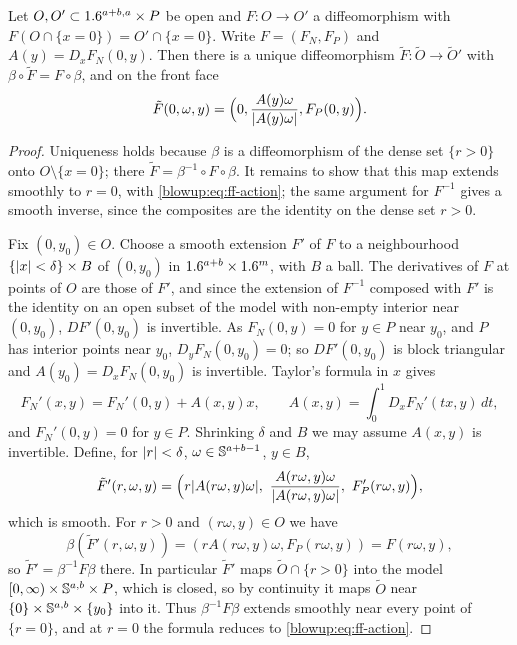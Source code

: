 \begin{theorem}\label{blowup:thm:invariance}
Let $O,O'\subset1.6^{a+b,a}\times P$ be open and $F:O\to O'$ a diffeomorphism with
$F(O\cap\{x=0\})=O'\cap\{x=0\}$. Write $F=(F_N,F_P)$ and
$A(y)=D_xF_N(0,y)$. Then there is a unique diffeomorphism $\tilde F:\tilde O\to\tilde O'$
with $\beta\circ\tilde F=F\circ\beta$, and on the front face
\begin{equation}\label{blowup:eq:ff-action}
  \tilde F(0,\omega,y)=\Big(0,\frac{A(y)\omega}{\lvert A(y)\omega\rvert},F_P(0,y)\Big).
\end{equation}
\end{theorem}
\begin{proof}
Uniqueness holds because $\beta$ is a diffeomorphism of the dense set $\{r>0\}$ onto
$O\setminus\{x=0\}$; there $\tilde F=\beta^{-1}\circ F\circ\beta$. It remains to show that
this map extends smoothly to $r=0$, with \eqref{blowup:eq:ff-action}; the same argument
for $F^{-1}$ gives a smooth inverse, since the composites are the identity on the dense
set $r>0$.

Fix $(0,y_0)\in O$. Choose a smooth extension $F'$ of $F$ to a neighbourhood
$\{\lvert x\rvert<\delta\}\times B$ of $(0,y_0)$ in $1.6^{a+b}\times1.6^m$, with $B$ a ball. The
derivatives of $F$ at points of $O$ are those of $F'$, and since the extension of $F^{-1}$
composed with $F'$ is the identity on an open subset of the model with non-empty
interior near $(0,y_0)$, $DF'(0,y_0)$ is invertible. As $F_N(0,y)=0$ for
$y\in P$ near $y_0$, and $P$ has interior points near $y_0$, $D_yF_N(0,y_0)=0$; so
$DF'(0,y_0)$ is block triangular and $A(y_0)=D_xF_N(0,y_0)$ is invertible. Taylor's
formula in $x$ gives
\begin{equation*}
  F_N'(x,y)=F_N'(0,y)+A(x,y)x,\qquad A(x,y)=\int_0^1D_xF_N'(tx,y)\,dt,
\end{equation*}
and $F_N'(0,y)=0$ for $y\in P$. Shrinking $\delta$ and $B$ we may assume $A(x,y)$ is
invertible. Define, for $\lvert r\rvert<\delta$, $\omega\in\mathbb{S}^{a+b-1}$, $y\in B$,
\begin{equation*}
  \tilde F'(r,\omega,y)=\Big(r\abs{A(r\omega,y)\omega},\
  \frac{A(r\omega,y)\omega}{\abs{A(r\omega,y)\omega}},\ F_P'(r\omega,y)\Big),
\end{equation*}
which is smooth. For $r>0$ and $(r\omega,y)\in O$ we have
\begin{equation*}
  \beta(\tilde F'(r,\omega,y))=(rA(r\omega,y)\omega,F_P(r\omega,y))=F(r\omega,y),
\end{equation*}
so
$\tilde F'=\beta^{-1}F\beta$ there. In particular $\tilde F'$ maps
$\tilde O\cap\{r>0\}$ into the model $[0,\infty)\times\mathbb{S}^{a,b}\times P$, which is
closed, so by continuity it maps $\tilde O$ near $\{0\}\times\mathbb{S}^{a,b}\times\{y_0\}$
into it. Thus $\beta^{-1}F\beta$ extends smoothly near every point of $\{r=0\}$, and at
$r=0$ the formula reduces to \eqref{blowup:eq:ff-action}.
\end{proof}

